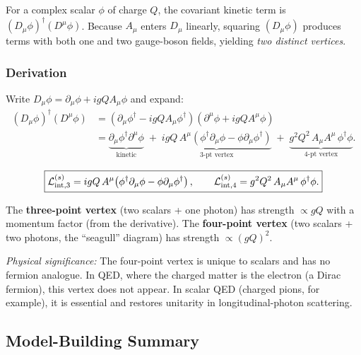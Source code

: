 \documentclass[../main.tex]{subfiles}
\begin{document}
For a complex scalar $\phi$ of charge $Q$, the covariant kinetic term is $(D_\mu\phi)^\dagger(D^\mu\phi)$.  Because $A_\mu$ enters $D_\mu$ linearly, squaring $(D_\mu\phi)$ produces terms with both one and two gauge-boson fields, yielding \emph{two distinct vertices}.

\subsubsection*{Derivation}

Write $D_\mu\phi = \partial_\mu\phi + igQA_\mu\phi$ and expand:
\begin{align}
  (D_\mu\phi)^\dagger(D^\mu\phi)
  &=(\partial_\mu\phi^\dagger - igQA_\mu\phi^\dagger)(\partial^\mu\phi + igQA^\mu\phi) \nonumber\\
  &= \underbrace{\partial_\mu\phi^\dagger\partial^\mu\phi}_{\text{kinetic}}
    \;+\; \underbrace{igQ\,A^\mu\!\left(\phi^\dagger\partial_\mu\phi
          - \phi\partial_\mu\phi^\dagger\right)}_{\text{3-pt vertex}}
    \;+\; \underbrace{g^2Q^2\,A_\mu A^\mu\,\phi^\dagger\phi}_{\text{4-pt vertex}}.
  \label{eq:lec11:scalar-expand}
\end{align}

\begin{equation}
  \boxed{
  \mathcal{L}_{\rm int,3}^{(s)} = igQ\,A^\mu\!\left(\phi^\dagger\partial_\mu\phi
    - \phi\partial_\mu\phi^\dagger\right),
  \qquad
  \mathcal{L}_{\rm int,4}^{(s)} = g^2Q^2\,A_\mu A^\mu\,\phi^\dagger\phi.}
  \label{eq:lec11:scalar-vertices}
\end{equation}

The \textbf{three-point vertex} (two scalars + one photon) has strength $\propto gQ$ with a momentum factor (from the derivative).  The \textbf{four-point vertex} (two scalars + two photons, the ``seagull'' diagram) has strength $\propto (gQ)^2$.

\textit{Physical significance:} The four-point vertex is unique to scalars and has no fermion analogue.  In QED, where the charged matter is the electron (a Dirac fermion), this vertex does not appear.  In scalar QED (charged pions, for example), it is essential and restores unitarity in longitudinal-photon scattering.

\subsection*{Model-Building Summary}\label{sec:lec11:model-building}
\end{document}
